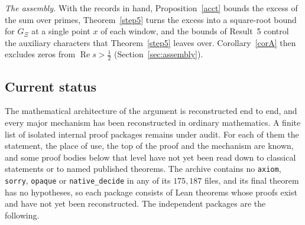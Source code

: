 \documentclass[11pt,letterpaper]{article}
\numberwithin{equation}{section}
\begin{document}
\emph{The assembly.} With the records in hand, Proposition~\ref{acct} bounds the excess of the sum over primes, Theorem~\ref{step5} turns the excess into a square-root bound for $G_\Xi$ at a single point $x$ of each window, and the bounds of Result~5 control the auxiliary characters that Theorem~\ref{step5} leaves over. Corollary~\ref{corA} then excludes zeros from $\operatorname{Re}s>\tfrac12$ (Section~\ref{sec:assembly}).

\subsection{Current status}\label{sec:status}

The mathematical architecture of the argument is reconstructed end to end, and every major mechanism has been reconstructed in ordinary mathematics. A finite list of isolated internal proof packages remains under audit. For each of them the statement, the place of use, the top of the proof and the mechanism are known, and some proof bodies below that level have not yet been read down to classical statements or to named published theorems. The archive contains no \texttt{axiom}, \texttt{sorry}, \texttt{opaque} or \texttt{native\_decide} in any of its $175{,}187$ files, and its final theorem has no hypotheses, so each package consists of Lean theorems whose proofs exist and have not yet been reconstructed. The independent packages are the following.
\end{document}
